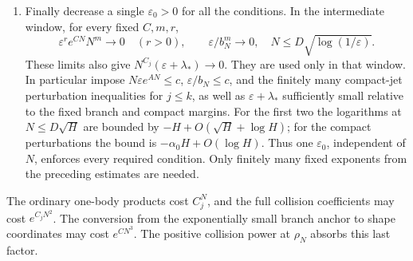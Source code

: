 \documentclass[11pt]{article}
\numberwithin{equation}{section}
\theoremstyle{definition}
\newcommand{\eps}{\varepsilon}
\begin{document}
\begin{enumerate}
for every \(N\ge N_0+2\), including the finitely many low orders.
Increase \(B\) further so that
\(\exp((A+4)N^3/2+\tfrac12N^2\log N+C_jN^2)
 (2e^{-BN})^{N^2-2j-4}\) is controlled for all large
\(N\) and every \(j\le k\). Only the remaining numerical bounds
at finitely many orders are absorbed into a point-dependent
constant; their support geometry already satisfies the inclusions.
\item Finally decrease a single \(\eps_0>0\) for all the conditions.
In the intermediate window, for every fixed \(C,m,r\),
\[
 \eps^r e^{CN}N^m\longrightarrow0\quad(r>0),\qquad
 \eps/b_N^m\longrightarrow0,
 \quad N\le D\sqrt{\log(1/\eps)}.
\]
These limits also give \(N^{C_j}(\eps+\lambda_*)\to0\).
They are used only in that window.
In particular impose \(N\eps e^{AN}\le c\),
\(\eps/b_N\le c\), and the finitely many compact-jet
perturbation inequalities for \(j\le k\), as well as
\(\eps+\lambda_*\) sufficiently small relative to the fixed
branch and compact margins. For the first two the logarithms
at \(N\le D\sqrt H\) are bounded by
\(-H+O(\sqrt H+\log H)\); for the compact perturbations the bound
is \(-\alpha_0H+O(\log H)\). Thus one \(\eps_0\), independent
of \(N\), enforces every required condition. Only finitely many
fixed exponents from the preceding estimates are needed.
\end{enumerate}

The ordinary one-body products cost \(C_j^N\), and the full collision
coefficients may cost \(e^{C_jN^2}\). The conversion from the
exponentially small branch anchor to shape coordinates may cost
\(e^{CN^3}\). The positive collision power at \(\rho_N\) absorbs this
last factor.
\end{document}
